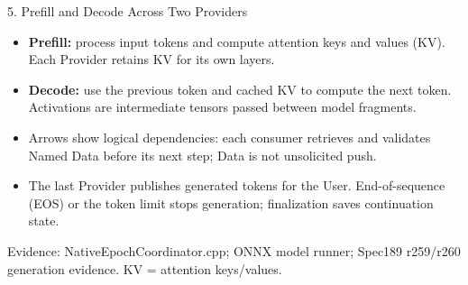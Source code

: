 \documentclass[10pt,aspectratio=169]{beamer}
\newcommand{\src}[1]{\vfill{\fontsize{6.5}{8}\selectfont\color{Gray}Evidence: #1\par}}
\begin{document}
\begin{frame}{5. Prefill and Decode Across Two Providers}
\begin{center}\end{center}
\small
\begin{itemize}
\item \textbf{Prefill:} process input tokens and compute attention keys and values (KV). Each Provider retains KV for its own layers.
\item \textbf{Decode:} use the previous token and cached KV to compute the next token. Activations are intermediate tensors passed between model fragments.
\item Arrows show logical dependencies: each consumer retrieves and validates Named Data before its next step; Data is not unsolicited push.
\item The last Provider publishes generated tokens for the User. End-of-sequence (EOS) or the token limit stops generation; finalization saves continuation state.
\end{itemize}
\src{NativeEpochCoordinator.cpp; ONNX model runner; Spec189 r259/r260 generation evidence. KV = attention keys/values.}
\end{frame}
\end{document}
